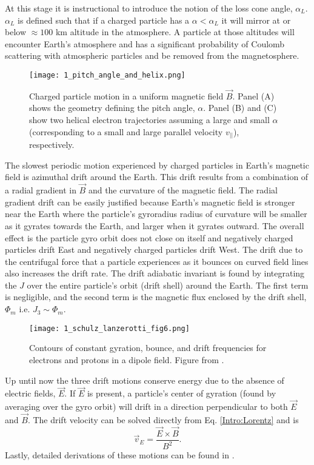 At this stage it is instructional to introduce the notion of the loss cone angle, $\alpha_L$. $\alpha_L$ is defined such that if a charged particle has a $\alpha < \alpha_L$ it will mirror at or below $\approx 100$ km altitude in the atmosphere. A particle at those altitudes will encounter Earth's atmosphere and has a significant probability of Coulomb scattering with atmospheric particles and be removed from the magnetosphere.

\begin{figure}
\texttt{[image: 1\_pitch\_angle\_and\_helix.png]}
\caption{Charged particle motion in a uniform magnetic field $\vec{B}$. Panel (A) shows the geometry defining the pitch angle, $\alpha$. Panel (B) and (C) show two helical electron trajectories assuming a large and small $\alpha$ (corresponding to a small and large parallel velocity $v_{||}$), respectively.}
\label{Intro:pa}
\end{figure}

The slowest periodic motion experienced by charged particles in Earth's magnetic field is azimuthal drift around the Earth. This drift results from a combination of a radial gradient in $\vec{B}$ and the curvature of the magnetic field. The radial gradient drift can be easily justified because Earth's magnetic field is stronger near the Earth where the particle's gyroradius radius of curvature will be smaller as it gyrates towards the Earth, and larger when it gyrates outward. The overall effect is the particle gyro orbit does not close on itself and negatively charged particles drift East and negatively charged particles drift West. The drift due to the centrifugal force that a particle experiences as it bounces on curved field lines also increases the drift rate. The drift adiabatic invariant is found by integrating the $J$ over the entire particle's orbit (drift shell) around the Earth. The first term is negligible, and the second term is the magnetic flux enclosed by the drift shell, $\Phi_m$  i.e. $J_3 \sim \Phi_m$. 

\begin{figure}
\texttt{[image: 1\_schulz\_lanzerotti\_fig6.png]}
\caption{Contours of constant gyration, bounce, and drift frequencies for electrons and protons in a dipole field. Figure from \citet{Schulz1974}.}
\label{Intro:adiabatic_frequencies}
\end{figure}

Up until now the three drift motions conserve energy due to the absence of  electric fields, $\vec{E}$. If $\vec{E}$ is present, a particle's center of gyration (found by averaging over the gyro orbit) will drift in a direction perpendicular to both $\vec{E}$ and $\vec{B}$. The drift velocity can be solved directly from Eq. \ref{Intro:Lorentz} and is
\begin{equation}
\vec{v}_E = \frac{\vec{E} \times \vec{B}}{B^2}.
\end{equation} Lastly, detailed derivations of these motions can be found in \citep{Baumjohann1997, Schulz1974, Tsurutani1997}.
        
